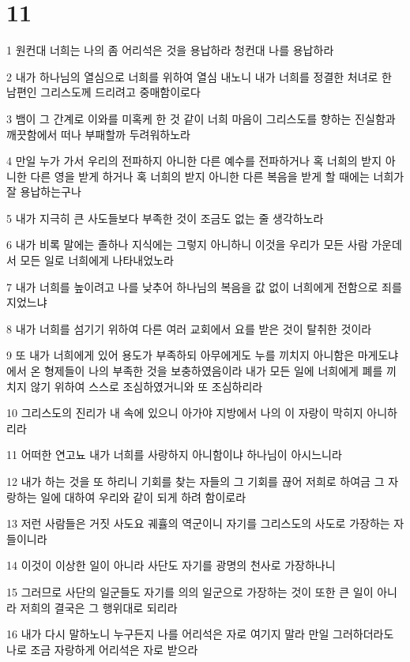 \chapter{11}

\par 1 원컨대 너희는 나의 좀 어리석은 것을 용납하라 청컨대 나를 용납하라
\par 2 내가 하나님의 열심으로 너희를 위하여 열심 내노니 내가 너희를 정결한 처녀로 한 남편인 그리스도께 드리려고 중매함이로다
\par 3 뱀이 그 간계로 이와를 미혹케 한 것 같이 너희 마음이 그리스도를 향하는 진실함과 깨끗함에서 떠나 부패할까 두려워하노라
\par 4 만일 누가 가서 우리의 전파하지 아니한 다른 예수를 전파하거나 혹 너희의 받지 아니한 다른 영을 받게 하거나 혹 너희의 받지 아니한 다른 복음을 받게 할 때에는 너희가 잘 용납하는구나
\par 5 내가 지극히 큰 사도들보다 부족한 것이 조금도 없는 줄 생각하노라
\par 6 내가 비록 말에는 졸하나 지식에는 그렇지 아니하니 이것을 우리가 모든 사람 가운데서 모든 일로 너희에게 나타내었노라
\par 7 내가 너희를 높이려고 나를 낮추어 하나님의 복음을 값 없이 너희에게 전함으로 죄를 지었느냐
\par 8 내가 너희를 섬기기 위하여 다른 여러 교회에서 요를 받은 것이 탈취한 것이라
\par 9 또 내가 너희에게 있어 용도가 부족하되 아무에게도 누를 끼치지 아니함은 마게도냐에서 온 형제들이 나의 부족한 것을 보충하였음이라 내가 모든 일에 너희에게 폐를 끼치지 않기 위하여 스스로 조심하였거니와 또 조심하리라
\par 10 그리스도의 진리가 내 속에 있으니 아가야 지방에서 나의 이 자랑이 막히지 아니하리라
\par 11 어떠한 연고뇨 내가 너희를 사랑하지 아니함이냐 하나님이 아시느니라
\par 12 내가 하는 것을 또 하리니 기회를 찾는 자들의 그 기회를 끊어 저희로 하여금 그 자랑하는 일에 대하여 우리와 같이 되게 하려 함이로라
\par 13 저런 사람들은 거짓 사도요 궤휼의 역군이니 자기를 그리스도의 사도로 가장하는 자들이니라
\par 14 이것이 이상한 일이 아니라 사단도 자기를 광명의 천사로 가장하나니
\par 15 그러므로 사단의 일군들도 자기를 의의 일군으로 가장하는 것이 또한 큰 일이 아니라 저희의 결국은 그 행위대로 되리라
\par 16 내가 다시 말하노니 누구든지 나를 어리석은 자로 여기지 말라 만일 그러하더라도 나로 조금 자랑하게 어리석은 자로 받으라
